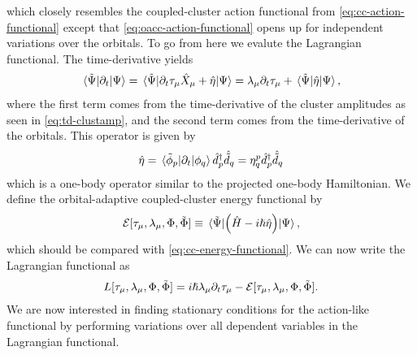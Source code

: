         which closely resembles the coupled-cluster action functional from
        \autoref{eq:cc-action-functional} except that
        \autoref{eq:oacc-action-functional} opens up for independent
        variations over the orbitals.
        To go from here we evalute the Lagrangian functional.
        The time-derivative yields
        \begin{align}
            \mel*{\tilde{\Psi}}{\partial_t}{\Psi}
            =
            \mel*{\tilde{\Psi}}{
                \partial_t \tau_{\mu}\hat{X}_{\mu}
                +
                \hat{\eta}
            }{\Psi}
            =
            \lambda_{\mu}\partial_t\tau_{\mu}
            + \mel*{\tilde{\Psi}}{\hat{\eta}}{\Psi},
        \end{align}
        where the first term comes from the time-derivative of the cluster
        amplitudes as seen in \autoref{eq:td-clustamp}, and the second term
        comes from the time-derivative of the orbitals.
        This operator is given by
        \begin{align}
            \hat{\eta}
            = \mel*{\tilde{\phi}_p}{\partial_t}{\phi_q}
            \hat{d}^{\dagger}_{p}\hat{\tilde{d}}_{q}
            = \eta^{p}_{q}\hat{d}^{\dagger}_{p}\hat{\tilde{d}}_{q}
        \end{align}
        which is a one-body operator similar to the projected one-body
        Hamiltonian.
        We define the orbital-adaptive coupled-cluster energy functional by
        \begin{align}
            \mathcal{E}[
                \tau_{\mu}, \lambda_{\mu}, \Phi, \tilde{\Phi}
            ]
            \equiv \mel*{\tilde{\Psi}}{
                \left( 
                    \hat{H} - i\hslash\hat{\eta}
                 \right)
            }{\Psi},
        \end{align}
        which should be compared with \autoref{eq:cc-energy-functional}.
        We can now write the Lagrangian functional as
        \begin{align}
            L[\tau_{\mu}, \lambda_{\mu}, \Phi, \tilde{\Phi}]
            =
            i\hslash\lambda_{\mu}\partial_t\tau_{\mu}
            -
            \mathcal{E}[
                \tau_{\mu}, \lambda_{\mu}, \Phi, \tilde{\Phi}
            ].
            \label{eq:oatdcc-lagrangian}
        \end{align}
        We are now interested in finding stationary conditions for the
        action-like functional by performing variations over all dependent
        variables in the Lagrangian functional.
